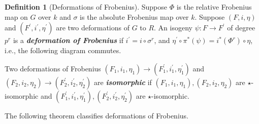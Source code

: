 \documentclass[12pt]{article}
\theoremstyle{definition}
\newtheorem{definition}[theorem]{Definition}
\begin{document}
    \begin{definition}[Deformations of Frobenius]
        Suppose $\Phi$ is the relative Frobenius map on $G$ over $k$ and $\sigma$ is the absolute Frobenius map over $k$. Suppose $(F,i,\eta)$ and $(F^\prime,i^\prime,\eta^\prime)$ are two deformations of $G$ to $R$. An isogeny $\psi \colon F \to F^\prime$ of degree $p^r$ is a \textbf{\em{deformation of Frobenius}} if $i^\prime = i \circ \sigma^r$, and $\eta^\prime \circ \pi^*(\psi) = i^*(\Phi^r) \circ \eta$, i.e., the following diagram commutes. 
        \begin{center}
        \end{center} \par 
        Two deformations of Frobenius $(F_1,i_1,\eta_1) \to (F_1^\prime,i_1^\prime,\eta_1^\prime)$ and $(F_2,i_2,\eta_2) \to (F_2^\prime,i_2^\prime,\eta_2^\prime)$ are \textbf{\em{isomorphic}} if $(F_1,i_1,\eta_1), (F_2,i_2,\eta_2)$ are $\star$-isomorphic and $(F_1^\prime,i_1^\prime,\eta_1^\prime), (F_2^\prime,i_2^\prime,\eta_2^\prime)$ are $\star$-isomorphic. 
    \end{definition}
    The following theorem classifies deformations of Frobenius. 
\end{document}
